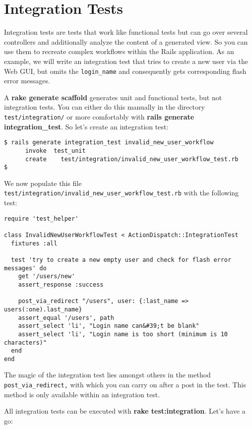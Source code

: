 \documentclass[a4paper]{book}
\newcounter{tab}[chapter]
\newcommand{\chap}[1]{\newpage\thispagestyle{empty}\chapter{#1}\label{chap:\thechapter}}
\begin{document}
\chap{Integration Tests}\label{integration-tests}

Integration tests are tests that work like functional tests but can go over several controllers and additionally analyze the content of a generated view. So you can use them to recreate complex workflows within the Rails application. As an example, we will write an integration test that tries to create a new user via the Web GUI, but omits the \texttt{login\_name} and consequently gets corresponding flash error messages.

A \textbf{rake generate scaffold} generates unit and functional tests, but not integration tests. You can either do this manually in the directory \texttt{test/integration/} or more comfortably with \textbf{rails generate integration\_test}. So let's create an integration test:

\begin{shaded}\begin{verbatim}
$ rails generate integration_test invalid_new_user_workflow
      invoke  test_unit
      create    test/integration/invalid_new_user_workflow_test.rb
$
\end{verbatim}\end{shaded}

We now populate this file \texttt{test/integration/invalid\_new\_user\_workflow\_test.rb} with the following test:

\begin{shaded}\begin{verbatim}
require 'test_helper'

class InvalidNewUserWorkflowTest < ActionDispatch::IntegrationTest
  fixtures :all

  test 'try to create a new empty user and check for flash error messages' do
    get '/users/new'
    assert_response :success

    post_via_redirect "/users", user: {:last_name => users(:one).last_name}
    assert_equal '/users', path
    assert_select 'li', "Login name can&#39;t be blank"
    assert_select 'li', "Login name is too short (minimum is 10 characters)"
  end
end
\end{verbatim}\end{shaded}

The magic of the integration test lies amongst others in the method \texttt{post\_via\_redirect,} with which you can carry on after a post in the test. This method is only available within an integration test.

All integration tests can be executed with \textbf{rake test:integration}. Let's have a go:
\end{document}
